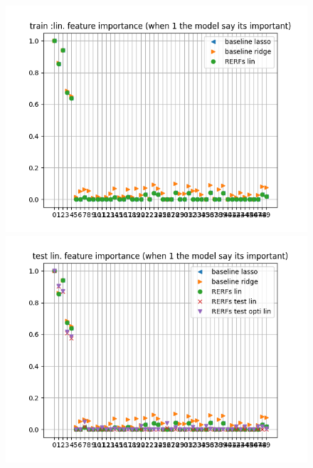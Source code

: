 \documentclass{article}
\begin{document}
\begin{figure}
\includegraphics[scale=0.7]{train_linear_feature_importance.png}

\includegraphics[scale=0.7]{test_linear_feature_importance.png}
\end{figure}

\newpage
\end{document}
